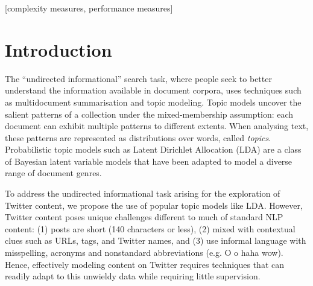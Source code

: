 \documentclass{sig-alternate}
\begin{document}
[complexity measures, performance measures]



\section{Introduction}
\label{sec:intro}

The ``undirected informational'' search task, where
people seek to better understand the information available in document corpora,
uses techniques such as multidocument summarisation and
topic modeling.  Topic models uncover the salient
patterns of a collection under the mixed-membership assumption: each
document can exhibit multiple patterns to different extents.  When
analysing text, these patterns are represented as distributions over
words, called \textit{topics}.  Probabilistic topic
models such as Latent Dirichlet Allocation (LDA) \cite{blei03} are a
class of Bayesian latent variable models
that have been adapted to model a diverse range of
document genres.

To address the undirected informational task arising for the 
exploration of Twitter content, we propose the use of popular topic
models like LDA.  However, 
Twitter content poses unique challenges different to much of standard
NLP content: 
(1) posts are short (140 characters or less),
(2) mixed with contextual clues such as URLs, tags, and Twitter names, and
(3) use informal language with misspelling, acronyms and 
nonstandard abbreviations (e.g. O o haha wow).
Hence, effectively modeling content on Twitter
requires techniques that can readily adapt to this unwieldy data while
requiring little supervision.  
\end{document}
